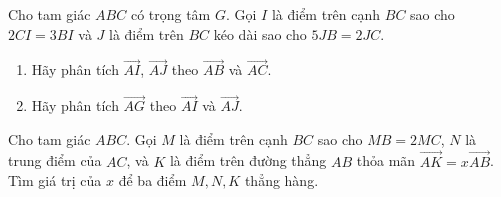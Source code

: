 \begin{bt}%
	Cho tam giác $ABC$ có trọng tâm $G$. Gọi $I$ là điểm trên cạnh $BC$ sao cho $2CI=3BI$ và $J$ là điểm trên $BC$ kéo dài sao cho $5JB=2JC$.
	\begin{enumerate}
		\item  Hãy phân tích $\overrightarrow{AI}$, $\overrightarrow{AJ}$ theo $\overrightarrow{AB}$ và $\overrightarrow{AC}$.
		\item Hãy phân tích $\overrightarrow{AG}$ theo $\overrightarrow{AI}$ và $\overrightarrow{AJ}$.
	\end{enumerate}
\end{bt}

\begin{bt}%
	Cho tam giác $ABC$. Gọi $M$ là điểm trên cạnh $BC$ sao cho $MB=2MC$, $N$ là trung điểm của $AC$, và $K$ là điểm trên đường thẳng $AB$ thỏa mãn $\overrightarrow{AK}=x\overrightarrow{AB}$. Tìm giá trị của $x$ để ba điểm $M, N, K$ thẳng hàng.
\end{bt}

